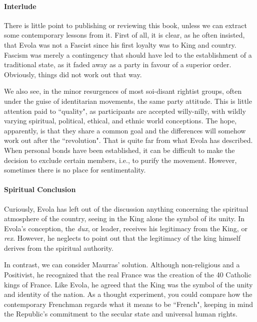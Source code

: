 \paragraph{Interlude}
\begin{quotex}
There is little point to publishing or reviewing this book, unless we can extract some contemporary lessons from it. First of all, it is clear, as he often insisted, that Evola was not a Fascist since his first loyalty was to King and country. Fascism was merely a contingency that should have led to the establishment of a traditional state, as it faded away as a party in favour of a superior order. Obviously, things did not work out that way.

We also see, in the minor resurgences of most soi-disant rightist groups, often under the guise of identitarian movements, the same party attitude. This is little attention paid to ``quality", as participants are accepted willy-nilly, with wildly varying spiritual, political, ethical, and ethnic world conceptions. The hope, apparently, is that they share a common goal and the differences will somehow work out after the ``revolution". That is quite far from what Evola has described. When personal bonds have been established, it can be difficult to make the decision to exclude certain members, i.e., to purify the movement. However, sometimes there is no place for sentimentality. 

\end{quotex}
\paragraph{Spiritual Conclusion}
Curiously, Evola has left out of the discussion anything concerning the spiritual atmosphere of the country, seeing in the King alone the symbol of its unity. In Evola's conception, the \emph{dux}, or leader, receives his legitimacy from the King, or \emph{rex}. However, he neglects to point out that the legitimacy of the king himself derives from the spiritual authority.

In contrast, we can consider Maurras' solution. Although non-religious and a Positivist, he recognized that the real France was the creation of the 40 Catholic kings of France. Like Evola, he agreed that the King was the symbol of the unity and identity of the nation. As a thought experiment, you could compare how the contemporary Frenchman regards what it means to be ``French", keeping in mind the Republic's commitment to the secular state and universal human rights.


